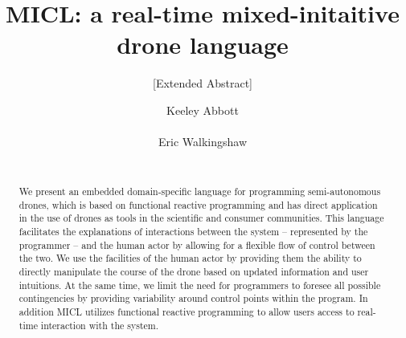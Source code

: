 \documentclass{sig-alternate-05-2015}
\begin{document}




\title{MICL: a real-time mixed-initaitive drone language}
\subtitle{[Extended Abstract]}

\author{
\alignauthor
Keeley Abbott\\
\\
\alignauthor
Eric Walkingshaw\\
\\
}

\maketitle
\begin{abstract}
We present an embedded domain-specific language for programming
semi-autonomous drones, which is based on functional reactive programming and
has direct application in the use of drones as tools in the scientific and
consumer communities. This language facilitates the explanations of
interactions between the system -- represented by the programmer -- and the
human actor by allowing for a flexible flow of control between the two. We use
the facilities of the human actor by providing them the ability to directly
manipulate the course of the drone based on updated information and user
intuitions. At the same time, we limit the need for programmers to foresee all
possible contingencies by providing variability around control points within
the program. In addition MICL utilizes functional reactive programming to
allow users access to real-time interaction with the system.
\end{abstract}
\end{document}
